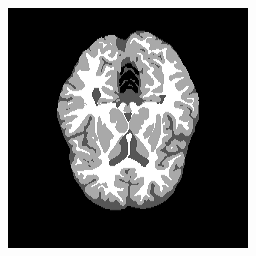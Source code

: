 \documentclass[varwidth=true, border=10pt, convert={size=640x}]{standalone}
\begin{document}
\begin{figure}
\begin{subfigure}[b]{.32\textwidth}
  \end{subfigure}
  \begin{subfigure}[b]{.32\textwidth}
 \includegraphics[width=.98\linewidth]{./images/Traindata5atslice19-Testlabel.png}
  \end{subfigure}

\label{feasibilityqualitative}

\end{figure}
\end{document}
